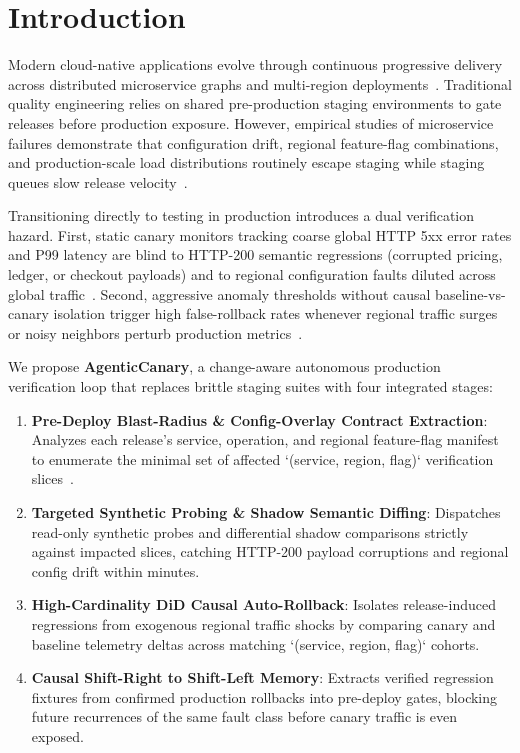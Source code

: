 \section{Introduction}
\label{sec:intro}

Modern cloud-native applications evolve through continuous progressive delivery across distributed microservice graphs and multi-region deployments~\cite{bates2021software,chen2023microservice,palvai2026developing}. Traditional quality engineering relies on shared pre-production staging environments to gate releases before production exposure. However, empirical studies of microservice failures demonstrate that configuration drift, regional feature-flag combinations, and production-scale load distributions routinely escape staging while staging queues slow release velocity~\cite{laigner2026empirical,jayalath2024microservice,mahdavihezaveh2021software,mahdavihezaveh2022feature}.

Transitioning directly to testing in production introduces a dual verification hazard. First, static canary monitors tracking coarse global HTTP 5xx error rates and P99 latency are blind to HTTP-200 semantic regressions (corrupted pricing, ledger, or checkout payloads) and to regional configuration faults diluted across global traffic~\cite{yu2023nezha,shi2026conceptual}. Second, aggressive anomaly thresholds without causal baseline-vs-canary isolation trigger high false-rollback rates whenever regional traffic surges or noisy neighbors perturb production metrics~\cite{sikha2023playbook,sirikonda2026reducing}.

We propose \textbf{AgenticCanary}, a change-aware autonomous production verification loop that replaces brittle staging suites with four integrated stages:
\begin{enumerate}
    \item \textbf{Pre-Deploy Blast-Radius \& Config-Overlay Contract Extraction}: Analyzes each release's service, operation, and regional feature-flag manifest to enumerate the minimal set of affected `(service, region, flag)` verification slices~\cite{chen2021cipc,chen2023microservice}.
    \item \textbf{Targeted Synthetic Probing \& Shadow Semantic Diffing}: Dispatches read-only synthetic probes and differential shadow comparisons strictly against impacted slices, catching HTTP-200 payload corruptions and regional config drift within minutes.
    \item \textbf{High-Cardinality DiD Causal Auto-Rollback}: Isolates release-induced regressions from exogenous regional traffic shocks by comparing canary and baseline telemetry deltas across matching `(service, region, flag)` cohorts.
    \item \textbf{Causal Shift-Right to Shift-Left Memory}: Extracts verified regression fixtures from confirmed production rollbacks into pre-deploy gates, blocking future recurrences of the same fault class before canary traffic is even exposed.
\end{enumerate}

